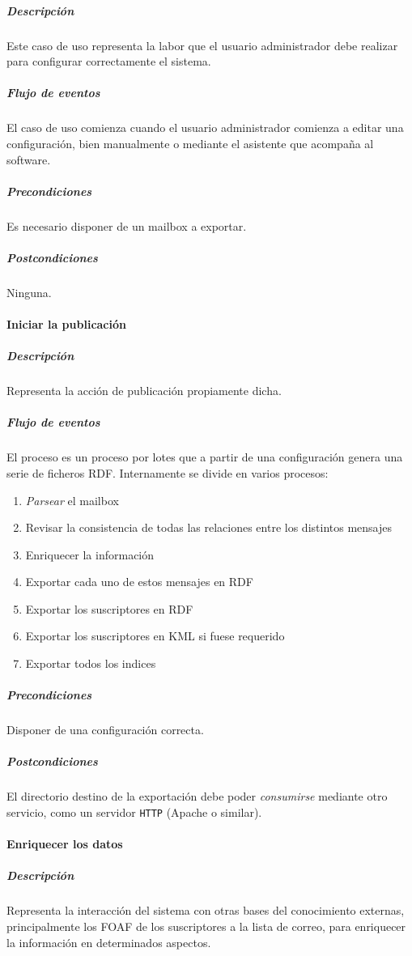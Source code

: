 \subparagraph{Descripción}Este caso de uso representa la labor que
el usuario administrador debe realizar para configurar correctamente 
el sistema.

\subparagraph{Flujo de eventos}El caso de uso comienza cuando el
usuario administrador comienza a editar una configuración, bien
manualmente o mediante el asistente que acompaña al software.

\subparagraph{Precondiciones}Es necesario disponer de un mailbox
a exportar.

\subparagraph{Postcondiciones}Ninguna.


\paragraph{Iniciar la publicación}

\subparagraph{Descripción}Representa la acción de publicación propiamente
dicha.

\subparagraph{Flujo de eventos}El proceso es un proceso por lotes que
a partir de una configuración genera una serie de ficheros RDF. Internamente
se divide en varios procesos:
\begin{enumerate}
 \item \emph{Parsear} el mailbox
 \item Revisar la consistencia de todas las relaciones entre los distintos mensajes
 \item Enriquecer la información
 \item Exportar cada uno de estos mensajes en RDF
 \item Exportar los suscriptores en RDF
 \item Exportar los suscriptores en KML si fuese requerido
 \item Exportar todos los indices
\end{enumerate}

\subparagraph{Precondiciones}Disponer de una configuración correcta.

\subparagraph{Postcondiciones}El directorio destino de la exportación
debe poder \emph{consumirse} mediante otro servicio, como un servidor
\texttt{HTTP} (Apache o similar).


\paragraph{Enriquecer los datos}

\subparagraph{Descripción}Representa la interacción del sistema con
otras bases del conocimiento externas, principalmente los FOAF de los
suscriptores a la lista de correo, para enriquecer la información en
determinados aspectos.

